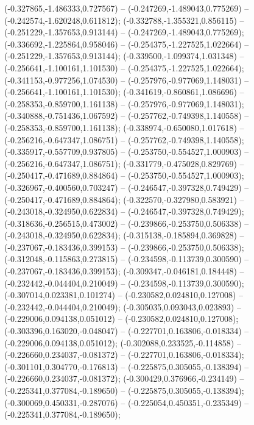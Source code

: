  (-0.327865,-1.486333,0.727567) -- (-0.247269,-1.489043,0.775269) -- (-0.242574,-1.620248,0.611812);
 (-0.332788,-1.355321,0.856115) -- (-0.251229,-1.357653,0.913144) -- (-0.247269,-1.489043,0.775269);
 (-0.336692,-1.225864,0.958046) -- (-0.254375,-1.227525,1.022664) -- (-0.251229,-1.357653,0.913144);
 (-0.339500,-1.099374,1.031348) -- (-0.256641,-1.100161,1.101530) -- (-0.254375,-1.227525,1.022664);
 (-0.341153,-0.977256,1.074530) -- (-0.257976,-0.977069,1.148031) -- (-0.256641,-1.100161,1.101530);
 (-0.341619,-0.860861,1.086696) -- (-0.258353,-0.859700,1.161138) -- (-0.257976,-0.977069,1.148031);
 (-0.340888,-0.751436,1.067592) -- (-0.257762,-0.749398,1.140558) -- (-0.258353,-0.859700,1.161138);
 (-0.338974,-0.650080,1.017618) -- (-0.256216,-0.647347,1.086751) -- (-0.257762,-0.749398,1.140558);
 (-0.335917,-0.557709,0.937805) -- (-0.253750,-0.554527,1.000903) -- (-0.256216,-0.647347,1.086751);
 (-0.331779,-0.475028,0.829769) -- (-0.250417,-0.471689,0.884864) -- (-0.253750,-0.554527,1.000903);
 (-0.326967,-0.400560,0.703247) -- (-0.246547,-0.397328,0.749429) -- (-0.250417,-0.471689,0.884864);
 (-0.322570,-0.327980,0.583921) -- (-0.243018,-0.324950,0.622834) -- (-0.246547,-0.397328,0.749429);
 (-0.318636,-0.256515,0.473002) -- (-0.239866,-0.253750,0.506338) -- (-0.243018,-0.324950,0.622834);
 (-0.315138,-0.185894,0.369828) -- (-0.237067,-0.183436,0.399153) -- (-0.239866,-0.253750,0.506338);
 (-0.312048,-0.115863,0.273815) -- (-0.234598,-0.113739,0.300590) -- (-0.237067,-0.183436,0.399153);
 (-0.309347,-0.046181,0.184448) -- (-0.232442,-0.044404,0.210049) -- (-0.234598,-0.113739,0.300590);
 (-0.307014,0.023381,0.101274) -- (-0.230582,0.024810,0.127008) -- (-0.232442,-0.044404,0.210049);
 (-0.305035,0.093043,0.023893) -- (-0.229006,0.094138,0.051012) -- (-0.230582,0.024810,0.127008);
 (-0.303396,0.163020,-0.048047) -- (-0.227701,0.163806,-0.018334) -- (-0.229006,0.094138,0.051012);
 (-0.302088,0.233525,-0.114858) -- (-0.226660,0.234037,-0.081372) -- (-0.227701,0.163806,-0.018334);
 (-0.301101,0.304770,-0.176813) -- (-0.225875,0.305055,-0.138394) -- (-0.226660,0.234037,-0.081372);
 (-0.300429,0.376966,-0.234149) -- (-0.225341,0.377084,-0.189650) -- (-0.225875,0.305055,-0.138394);
 (-0.300069,0.450331,-0.287076) -- (-0.225054,0.450351,-0.235349) -- (-0.225341,0.377084,-0.189650);
